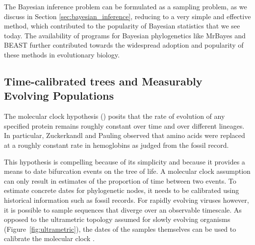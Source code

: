 The Bayesian inference problem can be formulated as a sampling problem, as we discuss in Section \ref{sec:bayesian_inference}, reducing to a very simple and effective method, which contributed to the popularity of Bayesian statistics that we see today. 
The availability of programs for Bayesian phylogenetics like MrBayes \citep{Huelsenbeck2001} and BEAST \citep{Drummond2012} further contributed towards the widespread adoption and popularity of these methods in evolutionary biology.

\subsection{Time-calibrated trees and Measurably Evolving Populations\label{sub:clocks}}

The molecular clock hypothesis (\cite{Zuckerkandl1962}) posits that the rate of evolution of any specified protein remains roughly constant over time and over different lineages.
In particular, Zuckerkandl and Pauling observed that amino acids were replaced at a roughly constant rate in hemoglobins as judged from the fossil record.


This hypothesis is compelling because of its simplicity and because it provides a means to date bifurcation events on the tree of life.
A molecular clock assumption can only result in estimates of the proportion of time between two events. 
To estimate concrete dates for phylogenetic nodes, it needs to be calibrated using historical information such as  fossil records.
For rapidly evolving viruses however, it is possible to sample sequences that diverge over an observable timescale. 
As opposed to the ultrametric topology assumed for slowly evolving organisms (Figure~\ref{fig:ultrametric}), the dates of the samples themselves can be used to calibrate the molecular clock \citep{Rambaut2000}.

